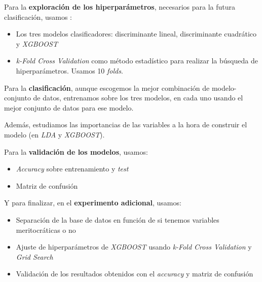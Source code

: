 Para la \textbf{exploración de los hiperparámetros}, necesarios para la futura clasificación, usamos \footnotemark:


\begin{itemize}
    \item Los tres modelos clasificadores: discriminante lineal, discriminante cuadrático y \textit{XGBOOST}
    \item \textit{k-Fold Cross Validation} como método estadístico para realizar la búsqueda de hiperparámetros. Usamos 10 \textit{folds}.
\end{itemize}

Para la \textbf{clasificación}, aunque escogemos la mejor combinación de modelo-conjunto de datos, entrenamos sobre los tres modelos, en cada uno usando el mejor conjunto de datos para ese modelo.

Además, estudiamos las importancias de las variables a la hora de construir el modelo (en \textit{LDA} y \textit{XGBOOST}).

Para la \textbf{validación de los modelos}, usamos:

\begin{itemize}
    \item \textit{Accuracy} sobre entrenamiento y \textit{test}
    \item Matriz de confusión
\end{itemize}

Y para finalizar, en el \textbf{experimento adicional}, usamos:

\begin{itemize}
    \item Separación de la base de datos en función de si tenemos variables meritocráticas o no
    \item Ajuste de hiperparámetros de \textit{XGBOOST} usando \textit{k-Fold Cross Validation} y \textit{Grid Search}
    \item Validación de los resultados obtenidos con el \textit{accuracy} y matriz de confusión
\end{itemize}


